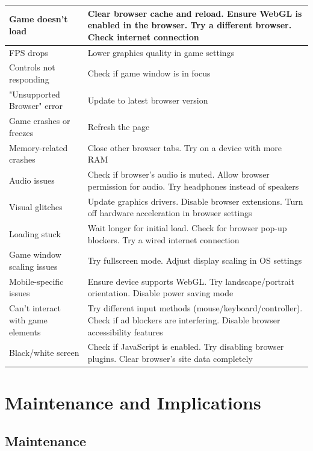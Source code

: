 \documentclass[11pt, a4paper]{article}
\begin{document}
\begin{tabularx}{\linewidth}{|>{\raggedright\arraybackslash}m{4cm}|X|}
    \hline
    Game doesn't load & Clear browser cache and reload. Ensure WebGL is enabled in the browser. Try a different browser. Check internet connection \\
    \hline
    FPS drops & Lower graphics quality in game settings \\
    \hline
    Controls not responding & Check if game window is in focus \\
    \hline
    "Unsupported Browser" error & Update to latest browser version \\
    \hline
    Game crashes or freezes & Refresh the page \\
    \hline
    Memory-related crashes & Close other browser tabs. Try on a device with more RAM \\
    \hline
    Audio issues & Check if browser's audio is muted. Allow browser permission for audio. Try headphones instead of speakers \\
    \hline
    Visual glitches & Update graphics drivers. Disable browser extensions. Turn off hardware acceleration in browser settings \\
    \hline
    Loading stuck & Wait longer for initial load. Check for browser pop-up blockers. Try a wired internet connection \\
    \hline
    Game window scaling issues & Try fullscreen mode. Adjust display scaling in OS settings \\
    \hline
    Mobile-specific issues & Ensure device supports WebGL. Try landscape/portrait orientation. Disable power saving mode \\
    \hline
    Can't interact with game elements & Try different input methods (mouse/keyboard/controller). Check if ad blockers are interfering. Disable browser accessibility features \\
    \hline
    Black/white screen & Check if JavaScript is enabled. Try disabling browser plugins. Clear browser's site data completely \\
    \hline
\end{tabularx}

\section{Maintenance and Implications}

\subsection{Maintenance}
\end{document}
